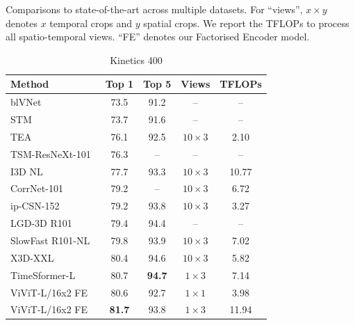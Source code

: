 \begin{table}[tb]
	\caption{Comparisons to state-of-the-art across multiple datasets. For ``views'', $x \times y$ denotes $x$ temporal crops and $y$ spatial crops.
	We report the TFLOPs to process all spatio-temporal views.
	``FE'' denotes our Factorised Encoder model.
	}
	\vspace{0.2\baselineskip}
	\begin{subtable}[t]{.40\linewidth}
		\centering
		\caption{Kinetics 400}
    	\setlength{\tabcolsep}{4pt} %
		\renewcommand*{\arraystretch}{1.11}  %
		
		\vspace{-0.3\baselineskip}
		\scriptsize{
			\begin{tabular}{lcccc}
				\toprule
				Method 																			 & Top 1                & Top 5         & Views 	& TFLOPs \\
				\midrule
				blVNet~\cite{fan_blvnet_neurips_2019}							  & 73.5 				  & 91.2  & --  & --\\ 
				STM~\cite{jiang_stm_iccv_2019}										& 73.7 					& 91.6	& -- & -- \\
				TEA~\cite{li_tea_cvpr_2020}												& 76.1					& 92.5 & $10 \times 3$ & 2.10 \\  %
				TSM-ResNeXt-101~\cite{lin_tsm_cvpr_2019}						  & 76.3				 & -- &  -- & -- \\
				I3D NL~\cite{wang_cvpr_2018}										 & 77.7                  & 93.3         		 &  $10 \times 3$ & 10.77     \\  %
				CorrNet-101~\cite{wang_corrnet_cvpr_2020}					  & 79.2				 & --			 		 & $10 \times 3$	& 6.72	 \\  %
				ip-CSN-152~\cite{tran_iccv_2019}									&  79.2					& 93.8				& $10 \times 3$	& 3.27	 \\  %
				LGD-3D R101~\cite{qiu_lgd_cvpr_2019}							&  79.4				    & 94.4			 		&  --	& --					\\  
				SlowFast R101-NL~\cite{feichtenhofer_iccv_2019}       		&  79.8                 &  93.9                   & $10 \times 3$    & 7.02   \\  %
				X3D-XXL~\cite{feichtenhofer_cvpr_2020}      					&  80.4					&  94.6			  		& $10 \times 3$   & 5.82   \\
				TimeSformer-L~\cite{bertasius_arxiv_2021}					  	& 80.7				& \textbf{94.7}					& $1 \times 3$ & 7.14 \\
				ViViT-L/16x2 FE 														  	 &  80.6 				& 92.7 & $1 \times 1$   & 3.98 \\  %
				ViViT-L/16x2 FE 															& \textbf{81.7} 	&  93.8  & $1 \times 3$ &  11.94 \\  %

\end{tabular}}
\end{subtable}
\end{table}
